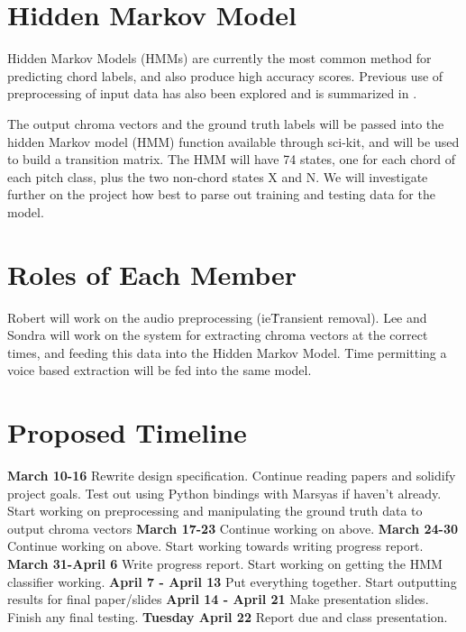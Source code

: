 \documentclass{article}
\begin{document}
\section{Hidden Markov Model}

Hidden Markov Models (HMMs) are currently the most common method for predicting
chord labels, and also produce high accuracy scores. Previous use of
preprocessing of input data has also been explored and is summarized in
\cite{McVicar:00}.

The output chroma vectors and the ground truth labels will be passed into the
hidden Markov model (HMM) function available through sci-kit, and will be used
to build a transition matrix. The HMM will have 74 states, one for each chord
of each pitch class, plus the two non-chord states X and N. We will investigate
further on the project how best to parse out training and testing data for the
model.

\section{Roles of Each Member}

Robert will work on the audio preprocessing (ie\. Transient removal).  Lee and
Sondra will work on the system for extracting chroma vectors at the correct
times, and feeding this data into the Hidden Markov Model. Time permitting a
voice based extraction will be fed into the same model.

\section{Proposed Timeline}\label{sec:timeline}

{\bf March 10-16}\newline
Rewrite design specification. Continue reading papers and solidify project
goals. Test out using Python bindings with Marsyas if haven't already. Start
working on preprocessing and manipulating the ground truth data to output
chroma vectors \newline
{\bf March 17-23}\newline
Continue working on above.
\newline
{\bf March 24-30}\newline
Continue working on above. Start working towards writing progress report.
\newline
{\bf March 31-April 6}\newline
Write progress report. Start working on getting the HMM classifier working.
\newline
{\bf April 7 - April 13}\newline
Put everything together. Start outputting results for final paper/slides
\newline
{\bf April 14 - April 21}\newline
Make presentation slides. Finish any final testing.
\newline
{\bf Tuesday April 22}\newline
Report due and class presentation.
\end{document}
